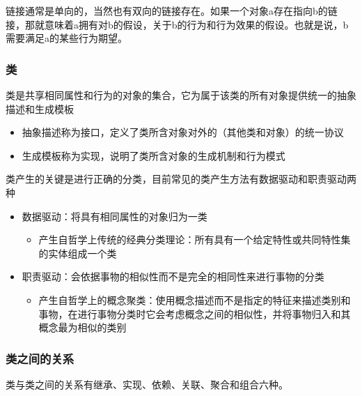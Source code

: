 链接通常是单向的，当然也有双向的链接存在。如果一个对象a存在指向b的链接，那就意味着a拥有对b的假设，关于b的行为和行为效果的假设。也就是说，b需要满足a的某些行为期望。

\subsubsection{类}
类是共享相同属性和行为的对象的集合，它为属于该类的所有对象提供统一的抽象描述和生成模板
\begin{itemize}
    \item 抽象描述称为接口，定义了类所含对象对外的（其他类和对象）的统一协议
    \item 生成模板称为实现，说明了类所含对象的生成机制和行为模式
\end{itemize}

类产生的关键是进行正确的分类，目前常见的类产生方法有数据驱动和职责驱动两种
\begin{itemize}
    \item 数据驱动：将具有相同属性的对象归为一类
    \begin{itemize}
        \item 产生自哲学上传统的经典分类理论：所有具有一个给定特性或共同特性集的实体组成一个类
    \end{itemize}
    \item 职责驱动：会依据事物的相似性而不是完全的相同性来进行事物的分类
    \begin{itemize}
        \item 产生自哲学上的概念聚类：使用概念描述而不是指定的特征来描述类别和事物，在进行事物分类时它会考虑概念之间的相似性，并将事物归入和其概念最为相似的类别
    \end{itemize}
\end{itemize}

\subsubsection{类之间的关系}
类与类之间的关系有继承、实现、依赖、关联、聚合和组合六种。
\vspace{-0.2em}

